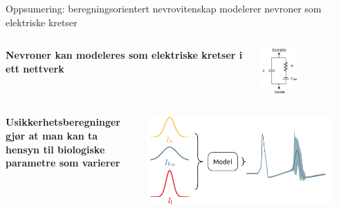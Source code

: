 \documentclass[presentation]{beamer}
\begin{document}
  \begin{frame}{Oppsumering: beregningsorientert nevrovitenskap modelerer nevroner som elektriske kretser}
\vspace{-15mm}
\begin{columns}

     \begin{center}
        \raggedright
      \bf{Nevroner kan modeleres som elektriske kretser i ett nettverk}
     \end{center}
     \begin{center}
            \includegraphics[width=0.4\textwidth]{circuit2.png}
     \end{center}

 \end{columns}

\pause
\begin{columns}
  \begin{center}
      \raggedright
   \bf{Usikkerhetsberegninger gjør at man kan ta hensyn til biologiske parametre som varierer}
  \end{center}
     \begin{center}
            \includegraphics[width=0.9\textwidth]{probabalistic_no_uncertainpy.png}
     \end{center}


\end{columns}
\end{frame}
\end{document}
